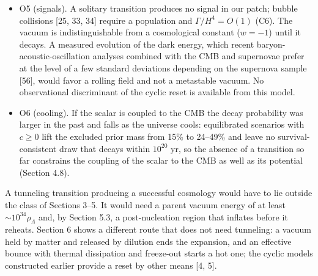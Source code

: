 \documentclass[11pt,a4paper]{article}
\begin{document}
\begin{itemize}
\item O5 (signals). A solitary transition produces no signal in our patch; bubble collisions [25, 33, 34] require a population and $\Gamma/H^4=O(1)$ (C6). The vacuum is indistinguishable from a cosmological constant ($w=-1$) until it decays. A measured evolution of the dark energy, which recent baryon-acoustic-oscillation analyses combined with the CMB and supernovae prefer at the level of a few standard deviations depending on the supernova sample [56], would favor a rolling field and not a metastable vacuum. No observational discriminant of the cyclic reset is available from this model.
\item O6 (cooling). If the scalar is coupled to the CMB the decay probability was larger in the past and falls as the universe cools: equilibrated scenarios with $c\ge0$ lift the excluded prior mass from 15\% to 24--49\% and leave no survival-consistent draw that decays within $10^{20}$ yr, so the absence of a transition so far constrains the coupling of the scalar to the CMB as well as its potential (Section 4.8).
\end{itemize}
A tunneling transition producing a successful cosmology would have to lie outside the class of Sections 3--5. It would need a parent vacuum energy of at least $\sim10^{34}\rho_\Lambda$ and, by Section 5.3, a post-nucleation region that inflates before it reheats. Section 6 shows a different route that does not need tunneling: a vacuum held by matter and released by dilution ends the expansion, and an effective bounce with thermal dissipation and freeze-out starts a hot one; the cyclic models constructed earlier provide a reset by other means [4, 5].
\end{document}
